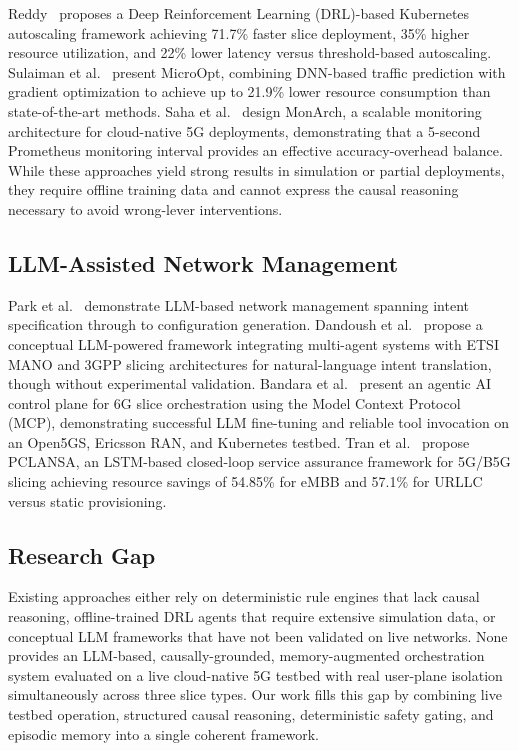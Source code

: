 \documentclass[12pt]{article}
\begin{document}
Reddy~\cite{reddy2025drl} proposes a Deep Reinforcement Learning
(DRL)-based Kubernetes autoscaling framework achieving 71.7\% faster
slice deployment, 35\% higher resource utilization, and 22\% lower
latency versus threshold-based autoscaling. Sulaiman
et al.~\cite{sulaiman2024microopt} present MicroOpt, combining DNN-based
traffic prediction with gradient optimization to achieve up to 21.9\%
lower resource consumption than state-of-the-art methods. Saha
et al.~\cite{saha2022monarch} design MonArch, a scalable monitoring
architecture for cloud-native 5G deployments, demonstrating that a
5-second Prometheus monitoring interval provides an effective
accuracy-overhead balance. While these approaches yield strong results
in simulation or partial deployments, they require offline training data
and cannot express the causal reasoning necessary to avoid wrong-lever
interventions.

\subsection{LLM-Assisted Network Management}

Park et al.~\cite{park2024llm} demonstrate LLM-based network management
spanning intent specification through to configuration generation.
Dandoush et al.~\cite{dandoush2024llm} propose a conceptual LLM-powered
framework integrating multi-agent systems with ETSI MANO and 3GPP slicing
architectures for natural-language intent translation, though without
experimental validation. Bandara et al.~\cite{bandara2026native} present
an agentic AI control plane for 6G slice orchestration using the Model
Context Protocol (MCP), demonstrating successful LLM fine-tuning and
reliable tool invocation on an Open5GS, Ericsson RAN, and Kubernetes
testbed. Tran et al.~\cite{tran2025closed} propose PCLANSA, an
LSTM-based closed-loop service assurance framework for 5G/B5G slicing
achieving resource savings of 54.85\% for eMBB and 57.1\% for URLLC
versus static provisioning.

\subsection{Research Gap}

Existing approaches either rely on deterministic rule engines that lack
causal reasoning, offline-trained DRL agents that require extensive
simulation data, or conceptual LLM frameworks that have not been validated
on live networks. None provides an LLM-based, causally-grounded,
memory-augmented orchestration system evaluated on a live cloud-native 5G
testbed with real user-plane isolation simultaneously across three slice
types. Our work fills this gap by combining live testbed operation,
structured causal reasoning, deterministic safety gating, and episodic
memory into a single coherent framework.
\end{document}

